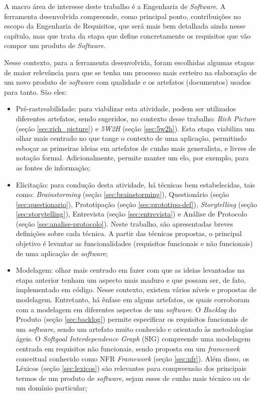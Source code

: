 A macro área de interesse deste trabalho é a Engenharia de \textit{Software}. A ferramenta desenvolvida compreende, como principal ponto, contribuições no escopo da Engenharia de Requisitos, que será mais bem detalhada ainda nesse capítulo, mas que trata da etapa que define concretamente os requisitos que vão compor um produto de \textit{Software}.

Nesse contexto, para a ferramenta desenvolvida, foram escolhidas algumas etapas de maior relevância para que se tenha um processo mais certeiro na elaboração de um novo produto de \textit{software} com qualidade e os artefatos (documentos) usados para tanto. São eles:

\begin{itemize}
    \item Pré-rastreabilidade: para viabilizar esta atividade, podem ser utilizados diferentes artefatos, sendo sugeridos, no contexto desse trabalho: \textit{Rich Picture} (seção \ref{sec:rich_picture}) e \textit{5W2H} (seção \ref{sec:5w2h}). Esta etapa viabiliza um olhar mais centrado no que tange o contexto de uma aplicação, permitindo esboçar as primeiras ideias em artefatos de cunho mais generalista, e livres de notação formal. Adicionalmente, permite manter um elo, por exemplo, para as fontes de informação;
    
    \item Elicitação: para condução desta atividade, há técnicas bem estabelecidas, tais como: \textit{Brainstorming} (seção \ref{sec:brainstorming}), Questionário (seção \ref{sec:questionario}), Prototipação (seção \ref{sec:prototipo-def}), \textit{Storytelling} (seção \ref{sec:storytelling}), Entrevista (seção \ref{sec:entrevista}) e Análise de Protocolo (seção \ref{sec:analise-protocolo}). Neste trabalho, são apresentadas breves definições sobre cada técnica. A partir das técnicas propostas, o principal objetivo é levantar as funcionalidades (requisitos funcionais e não funcionais) de uma aplicação de \textit{software};
    
    \item Modelagem: olhar mais centrado em fazer com que as ideias levantadas na etapa anterior tenham um aspecto mais maduro e que possam ser, de fato, implementado em código. Nesse contexto, existem vários níveis e propostas de modelagem. Entretanto, há ênfase em alguns artefatos, os quais corroboram com a modelagem em diferentes aspectos de um \textit{software}. O \textit{Backlog} do Produto (seção \ref{sec:backlog}) permite especificar os requisitos funcionais de um \textit{software}, sendo um artefato muito conhecido e orientado às metodologias ágeis. O \textit{Softgoal Interdependence Graph} (SIG) compreende uma modelagem centrada em requisitos não funcionais, sendo proposta em um \textit{framework} conceitual conhecido como NFR \textit{Framework} (seção \ref{sec:nfr}). Além disso, os Léxicos (seção \ref{sec:lexicos}) são relevantes para compreensão dos principais termos de um produto de \textit{software}, sejam esses de cunho mais técnico ou de um domínio particular;
    

\end{itemize}
